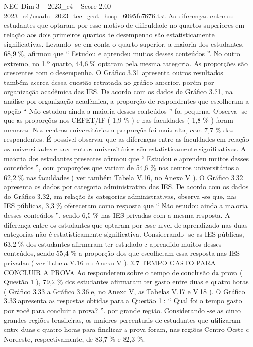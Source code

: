 \begin{textsample}{NEG Dim 3 – 2023\_c4 – Score 2.00 – 2023\_c4/enade\_2023\_tec\_gest\_hosp\_6095fc7676.txt}
As diferenças entre os estudantes que optaram por esse motivo de dificuldade no quartos superiores em relação aos dois primeiros quartos de desempenho são estatisticamente significativas.
Levando -se em conta o quarto superior, a maioria dos estudantes, 68,9 \%, afirmou que “ Estudou e aprendeu muitos desses conteúdos ”.
No outro extremo, no 1.º quarto, 44,6 \% optaram pela mesma categoria.
As proporções são crescentes com o desempenho.
O Gráfico 3.31 apresenta outros resultados também acerca dessa questão retratada no gráfico anterior, porém por organização acadêmica das IES.
De acordo com os dados do Gráfico 3.31, na análise por organização acadêmica, a proporção de respondentes que escolheram a opção “ Não estudou ainda a maioria desses conteúdos ” foi pequena.
Observa -se que as proporções nos CEFET/IF ( 1,9 \% ) e nas faculdades ( 1,8 \% ) foram menores.
Nos centros universitários a proporção foi mais alta, com 7,7 \% dos respondentes.
É possível observar que as diferenças entre as faculdades em relação as universidades e aos centros universitários são estatisticamente significativas.
A maioria dos estudantes presentes afirmou que “ Estudou e aprendeu muitos desses conteúdos ”, com proporções que variam de 54,6 \% nos centros universitários a 62,2 \% nas faculdades ( ver também Tabela V.16, no Anexo V ).
O Gráfico 3.32 apresenta os dados por categoria administrativa das IES.
De acordo com os dados do Gráfico 3.32, em relação às categorias administrativas, observa -se que, nas IES públicas, 3,3 \% ofereceram como resposta que “ Não estudou ainda a maioria desses conteúdos ”, sendo 6,5 \% nas IES privadas com a mesma resposta.
A diferença entre os estudantes que optaram por esse nível de aprendizado nas duas categorias não é estatisticamente significativa.
Considerando -se as IES públicas, 63,2 \% dos estudantes afirmaram ter estudado e aprendido muitos desses conteúdos, sendo 55,4 \% a proporção dos que escolheram essa resposta nas IES privadas ( ver Tabela V.16 no Anexo V ). 3.7 TEMPO GASTO PARA CONCLUIR A PROVA Ao responderem sobre o tempo de conclusão da prova ( Questão 1 ), 79,2 \% dos estudantes afirmaram ter gasto entre duas e quatro horas ( Gráfico 3.33 a Gráfico 3.36 e, no Anexo V, as Tabelas V.17 e V.18 ).
O Gráfico 3.33 apresenta as respostas obtidas para a Questão 1 : “ Qual foi o tempo gasto por você para concluir a prova? ”, por grande região.
Considerando -se as cinco grandes regiões brasileiras, os maiores percentuais de estudantes que utilizaram entre duas e quatro horas para finalizar a prova foram, nas regiões Centro-Oeste e Nordeste, respectivamente, de 83,7 \% e 82,3 \%.

\end{textsample}
